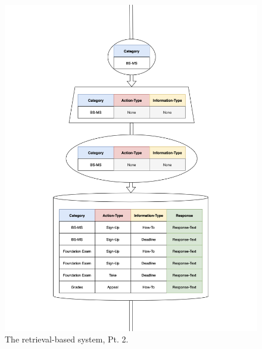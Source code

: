 \documentclass[titlepage, 12pt]{article}
\begin{document}
\begin{figure}[p]
    \centering\includegraphics[width=1\linewidth]{images/retrieval-2.png}
    \caption{The retrieval-based system, Pt. 2.}
\end{figure}
\end{document}

